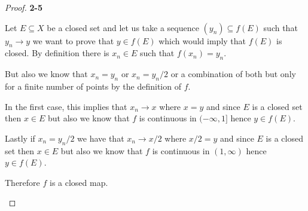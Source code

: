 \documentclass[11pt]{article}
\theoremstyle{definition}
\begin{document}
\begin{proof}{\textbf{2-5}}
\begin{itemize}
    Let $E \subseteq X$ be a closed set and let us take a sequence
    $(y_n) \subseteq f(E)$ such that $y_n \to y$ we want to prove that
    $y \in f(E)$ which would imply that $f(E)$ is closed.
    By definition there is $x_n \in E$ such that $f(x_n) = y_n$.
    
    But also we know that $x_n = y_n$ or
    $x_n = y_n /2$ or a combination of both but only for a finite number of
    points by the definition of $f$.

    In the first case, this implies that $x_n \to x$ where $x = y$ and since
    $E$ is a closed set then $x \in E$ but also we know that $f$ is continuous
    in $(-\infty, 1]$ hence $y \in f(E)$.
        
    Lastly if $x_n = y_n /2$ we have that
    $x_n \to x/2$ where $x/2 = y$ and since
    $E$ is a closed set then $x \in E$ but also we know that $f$ is continuous
    in $(1,\infty)$ hence $y \in f(E)$.

    Therefore $f$ is a closed map.
\end{itemize}
\end{proof}
\end{document}
